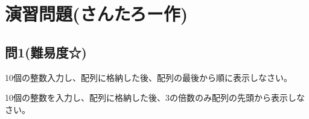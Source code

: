 \section{演習問題(さんたろー作)}
\subsection{問1(難易度☆)}
10個の整数入力し、配列に格納した後、配列の最後から順に表示しなさい。

10個の整数を入力し、配列に格納した後、3の倍数のみ配列の先頭から表示しなさい。
